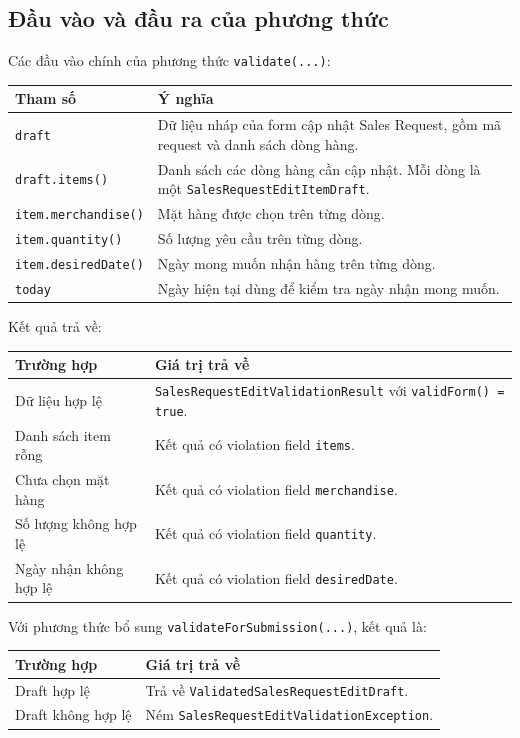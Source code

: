 \documentclass[12pt,a4paper]{article}
\newcommand{\code}[1]{\texttt{#1}}
\begin{document}
\subsection{Đầu vào và đầu ra của phương thức}

Các đầu vào chính của phương thức \code{validate(...)}:

\begin{longtable}{p{}p{}}
\toprule
\textbf{Tham số} & \textbf{Ý nghĩa}\\
\midrule
\code{draft} & Dữ liệu nháp của form cập nhật Sales Request, gồm mã request và danh sách dòng hàng.\\
\code{draft.items()} & Danh sách các dòng hàng cần cập nhật. Mỗi dòng là một \code{SalesRequestEditItemDraft}.\\
\code{item.merchandise()} & Mặt hàng được chọn trên từng dòng.\\
\code{item.quantity()} & Số lượng yêu cầu trên từng dòng.\\
\code{item.desiredDate()} & Ngày mong muốn nhận hàng trên từng dòng.\\
\code{today} & Ngày hiện tại dùng để kiểm tra ngày nhận mong muốn.\\
\bottomrule
\end{longtable}

Kết quả trả về:

\begin{longtable}{p{}p{}}
\toprule
\textbf{Trường hợp} & \textbf{Giá trị trả về}\\
\midrule
Dữ liệu hợp lệ & \code{SalesRequestEditValidationResult} với \code{validForm() = true}.\\
Danh sách item rỗng & Kết quả có violation field \code{items}.\\
Chưa chọn mặt hàng & Kết quả có violation field \code{merchandise}.\\
Số lượng không hợp lệ & Kết quả có violation field \code{quantity}.\\
Ngày nhận không hợp lệ & Kết quả có violation field \code{desiredDate}.\\
\bottomrule
\end{longtable}

Với phương thức bổ sung \code{validateForSubmission(...)}, kết quả là:
\begin{longtable}{p{}p{}}
\toprule
\textbf{Trường hợp} & \textbf{Giá trị trả về}\\
\midrule
Draft hợp lệ & Trả về \code{ValidatedSalesRequestEditDraft}.\\
Draft không hợp lệ & Ném \code{SalesRequestEditValidationException}.\\
\bottomrule
\end{longtable}
\end{document}
